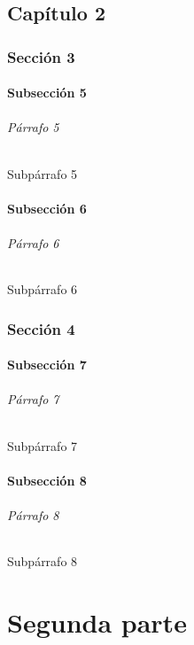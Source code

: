 \documentclass[11pt,a4paper]{book}
\begin{document}
     \chapter{Capítulo 2}
      \section{Sección 3}
       \subsection{Subsección 5}
       \lipsum[1]
       \paragraph{Párrafo 5 }
       \lipsum[2] 
       \subparagraph{Subpárrafo 5} 
       \lipsum[4] 
       \subsection{Subsección 6}
       \lipsum[1]
       \paragraph{Párrafo 6 }
       \lipsum[2] 
       \subparagraph{Subpárrafo 6} 
       \lipsum[4] 
      \section{Sección 4}
       \subsection{Subsección 7}
       \lipsum[1]
       \paragraph{Párrafo 7 }
       \lipsum[2] 
       \subparagraph{Subpárrafo 7} 
       \lipsum[4] 
       \subsection{Subsección 8}
       \lipsum[1]
       \paragraph{Párrafo 8 }
       \lipsum[2] 
       \subparagraph{Subpárrafo 8} 
       \lipsum[4] 
    \part{Segunda parte}
\end{document}
